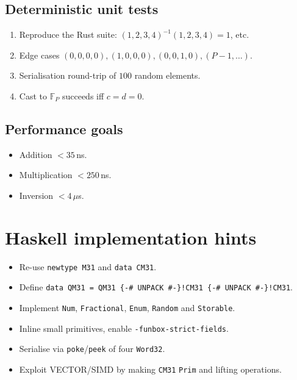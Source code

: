 \documentclass{article}
\begin{document}
\subsection{Deterministic unit tests}

\begin{enumerate}[label=\textbf{T\arabic*}.]
\item Reproduce the Rust suite:  
      \((1,2,3,4)^{-1}(1,2,3,4)=1\), etc.
\item Edge cases \((0,0,0,0),(1,0,0,0),(0,0,1,0),(P\!-\!1,\dots)\).
\item Serialisation round-trip of \(100\) random elements.
\item Cast to \(\mathbb{F}_{P}\) succeeds iff \(c=d=0\).
\end{enumerate}

\subsection{Performance goals}

\begin{itemize}[nosep]
\item Addition \(<\!35\)\,ns.
\item Multiplication \(<\!250\)\,ns.
\item Inversion \(<\!4\)\,$\mu$s.
\end{itemize}

\section{Haskell implementation hints}

\begin{itemize}[nosep]
\item Re-use \verb|newtype M31| and \verb|data CM31|.
\item Define
      \verb|data QM31 = QM31 {-# UNPACK #-}!CM31 {-# UNPACK #-}!CM31|.
\item Implement \verb|Num|, \verb|Fractional|, \verb|Enum|,
      \verb|Random| and \verb|Storable|.
\item Inline small primitives, enable \verb|-funbox-strict-fields|.
\item Serialise via \verb|poke|/\verb|peek| of four \verb|Word32|.
\item Exploit VECTOR/SIMD by making \verb|CM31| \verb|Prim| and
      lifting operations.
\end{itemize}
\end{document}
